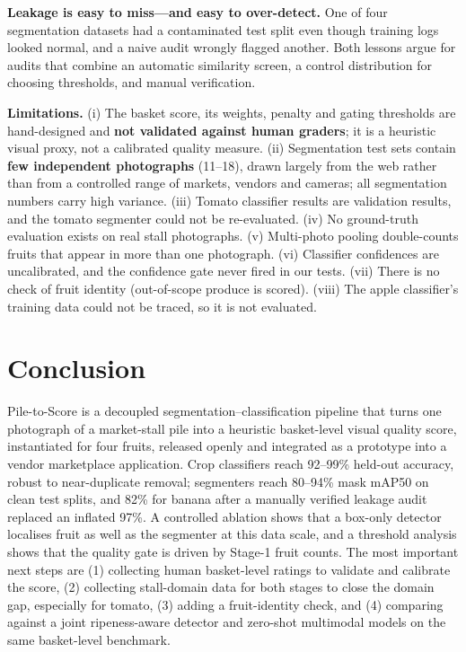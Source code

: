 \documentclass[10pt,twocolumn]{article}
\begin{document}
\textbf{Leakage is easy to miss---and easy to over-detect.} One of four segmentation datasets had a contaminated test split even though training logs looked normal, and a naive audit wrongly flagged another. Both lessons argue for audits that combine an automatic similarity screen, a control distribution for choosing thresholds, and manual verification.

\textbf{Limitations.} (i) The basket score, its weights, penalty and gating thresholds are hand-designed and \textbf{not validated against human graders}; it is a heuristic visual proxy, not a calibrated quality measure. (ii) Segmentation test sets contain \textbf{few independent photographs} (11--18), drawn largely from the web rather than from a controlled range of markets, vendors and cameras; all segmentation numbers carry high variance. (iii) Tomato classifier results are validation results, and the tomato segmenter could not be re-evaluated. (iv) No ground-truth evaluation exists on real stall photographs. (v) Multi-photo pooling double-counts fruits that appear in more than one photograph. (vi) Classifier confidences are uncalibrated, and the confidence gate never fired in our tests. (vii) There is no check of fruit identity (out-of-scope produce is scored). (viii) The apple classifier's training data could not be traced, so it is not evaluated.

\section{Conclusion}
Pile-to-Score is a decoupled segmentation--classification pipeline that turns one photograph of a market-stall pile into a heuristic basket-level visual quality score, instantiated for four fruits, released openly and integrated as a prototype into a vendor marketplace application. Crop classifiers reach 92--99\% held-out accuracy, robust to near-duplicate removal; segmenters reach 80--94\% mask mAP50 on clean test splits, and 82\% for banana after a manually verified leakage audit replaced an inflated 97\%. A controlled ablation shows that a box-only detector localises fruit as well as the segmenter at this data scale, and a threshold analysis shows that the quality gate is driven by Stage-1 fruit counts. The most important next steps are (1) collecting human basket-level ratings to validate and calibrate the score, (2) collecting stall-domain data for both stages to close the domain gap, especially for tomato, (3) adding a fruit-identity check, and (4) comparing against a joint ripeness-aware detector and zero-shot multimodal models on the same basket-level benchmark.
\end{document}
